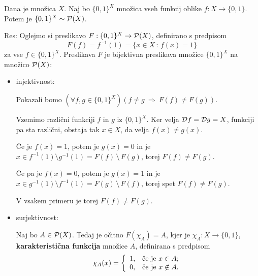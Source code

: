 \documentclass[11pt,paper=b5,footinclude,headinclude]{scrbook} %
\newcounter{example}
\def\sledi {{~\Rightarrow~}}
\def\brez {{\,\setminus\,}}
\begin{document}
\bigskip

\begin{example*}

Dana je množica $X$. Naj bo $\{0,1\}^X$ množica vseh funkcij oblike $f: X\to \{0,1\}$.
Potem je $\{0,1\}^X\sim {\cal P}(X)$.

Res:
Oglejmo si preslikavo
$F:\{0,1\}^X\to {\cal P}(X)$, definirano s predpisom
$$F(f) = f^{-1}(1) = \{x\in X\,:\,f(x) = 1\}$$
za vse $f\in \{0,1\}^X$.
Preslikava $F$ je bijektivna preslikava množice $\{0,1\}^X$ na množico ${\cal P}(X)$:
\begin{itemize}
  \item injektivnost:

Pokazali bomo $(\forall f,g\in \{0,1\}^X)(f\neq g\sledi F(f)\neq F(g))$.

Vzemimo različni funkciji $f$ in $g$ iz $\{0,1\}^X$. Ker velja ${\cal D}f = {\cal D}g = X$, funkciji pa sta različni,
obstaja tak $x\in X$, da velja $f(x) \neq g(x)$.

Če je $f(x) = 1$, potem je $g(x) = 0$ in je $x\in f^{-1}(1) \setminus g^{-1}(1) = F(f)\brez F(g)$, torej $F(f)\neq F(g)$.

Če pa je $f(x) = 0$, potem je $g(x) = 1$ in je $x\in g^{-1}(1) \setminus f^{-1}(1) = F(g)\brez F(f)$, torej spet $F(f)\neq F(g)$.

V vsakem primeru je torej $F(f) \neq F(g)$.

  \item surjektivnost:

  Naj bo $A\in {\cal P}(X)$. Tedaj je očitno $F(\chi_A) = A$, kjer je ${\chi_A}:X\to \{0,1\}$, \textbf{karakteristična funkcija}
  množice $A$, definirana s predpisom
  $$\chi_A(x) = \left\{
  \begin{array}{ll}
              1, & \hbox{če je $x\in A$;} \\
              0, & \hbox{če je $x\not\in A$.}
            \end{array}
          \right.$$
\end{itemize}
\end{example*}
\end{document}
